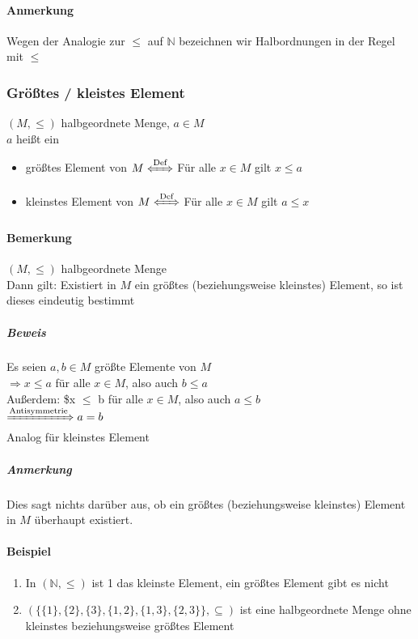 \documentclass[a4paper]{scrartcl}
\begin{document}
\paragraph{Anmerkung}
\label{sec-2-5-3-2}
Wegen der Analogie zur $\leq$ auf $\mathbb{N}$ bezeichnen wir Halbordnungen in der Regel mit $\leq$
\subsubsection{Größtes / kleistes Element}
\label{sec-2-5-4}
$(M, \leq)$ halbgeordnete Menge, $a\in M$ \\
    $a$ heißt ein
\begin{itemize}
\item größtes Element von $M\xLeftrightarrow{\text{Def}}$ Für alle $x\in M$ gilt $x\leq a$
\item kleinstes Element von $M\xLeftrightarrow{\text{Def}}$ Für alle $x\in M$ gilt $a\leq x$
\end{itemize}
\paragraph{Bemerkung}
\label{sec-2-5-4-1}
$(M,\leq)$ halbgeordnete Menge \\
     Dann gilt: Existiert in $M$ ein größtes (beziehungsweise kleinstes) Element, so ist dieses eindeutig bestimmt
\subparagraph{Beweis}
\label{sec-2-5-4-1-1}
Es seien $a,b\in M$ größte Elemente von $M$ \\
      $\Rightarrow x\leq a$ für alle $x\in M$, also auch $b\leq a$ \\
      Außerdem: \$x $\le$ b für alle $x\in M$, also auch $a\leq b$ \\
      $\xRightarrow{\text{Antisymmetrie}} a = b$ \\
      Analog für kleinstes Element
\subparagraph{Anmerkung}
\label{sec-2-5-4-1-2}
Dies sagt nichts darüber aus, ob ein größtes (beziehungsweise kleinstes) Element in $M$ überhaupt existiert.
\paragraph{Beispiel}
\label{sec-2-5-4-2}
\begin{enumerate}
\item In $(\mathbb{N},\leq)$ ist 1 das kleinste Element, ein größtes Element gibt es nicht
\item $(\{\{1\},\{2\},\{3\},\{1,2\},\{1,3\},\{2,3\}\}, \subseteq)$ ist eine halbgeordnete Menge ohne kleinstes beziehungsweise größtes Element
\end{enumerate}
\end{document}
